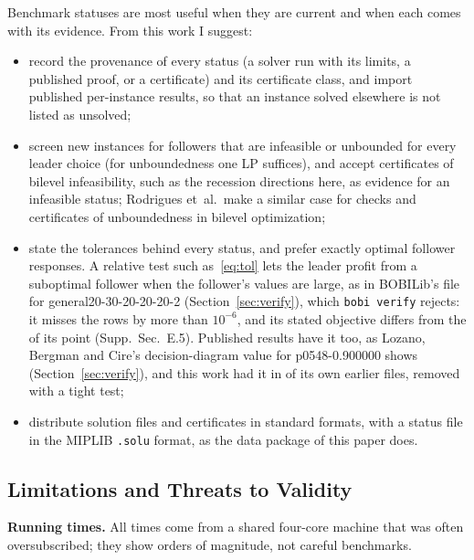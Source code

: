 \documentclass[]{spie}  %
\theoremstyle{plain}
\newcommand{\supp}[1]{Supp.\ Sec.~#1}
\newcommand{\code}[1]{\texttt{#1}}
\newcommand{\inst}[1]{\mbox{#1}}             %
\begin{document}
Benchmark statuses are most useful when they are current and when each comes with its evidence.
From this work I suggest:
\begin{itemize}
\item record the provenance of every status (a solver run with its limits, a published proof, or
a certificate) and its certificate class, and import published per-instance results, so that an
instance solved elsewhere is not listed as unsolved;
\item screen new instances for followers that are infeasible or unbounded for every leader
choice (for unboundedness one LP suffices\cite{fischetti2018intersection}), and accept certificates
of bilevel infeasibility, such as the recession directions here, as evidence for an infeasible
status; Rodrigues et~al.\ make a similar case for checks and certificates of unboundedness in
bilevel optimization;\cite{rodrigues2026unboundedness}
\item state the tolerances behind every status, and prefer exactly optimal follower responses.
A relative test such as~\eqref{eq:tol} lets the leader profit from a suboptimal follower when the
follower's values are large, as in BOBILib's file for \inst{general20-30-20-20-20-2}
(Section~\ref{sec:verify}), which \code{bobi verify} rejects: it misses the rows by more than
$10^{-6}$, and its stated objective \GenTolObjFile{} differs from the \GenTolObjComputed{} of its
point (\supp{E.5}). Published results have it too, as Lozano, Bergman and Cire's
decision-diagram value for \inst{p0548-0.900000} shows (Section~\ref{sec:verify}), and this work had
it in \NumTightSupersededBench{} of its own earlier files, removed with a tight test;
\item distribute solution files and certificates in standard formats, with a status file in the
MIPLIB \code{.solu} format, as the data package of this paper does.
\end{itemize}

\subsection{Limitations and Threats to Validity}\label{sec:limits}

\textbf{Running times.} All times come from a shared four-core machine that was often
oversubscribed; they show orders of magnitude, not careful benchmarks.
\end{document}

